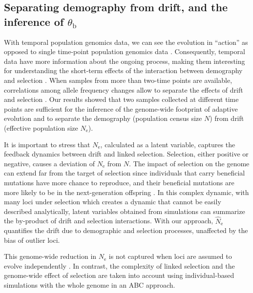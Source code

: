 \documentclass[a4paper, 12pt]{article}
\begin{document}
\subsection*{Separating demography from drift, and the inference of $\theta_{\mathrm{b}}$}

With temporal population genomics data, we can see the evolution in ``action'' as opposed to single time-point population genomics data \citep{Feder:2021bt}. Consequently, temporal data have more information about the ongoing process, making them interesting for understanding the short-term effects of the interaction between demography and selection \citep{Buffalo:2019ab, Dehasque:2020ku, Williams:2020gk}. When samples from more than two-time points are available, correlations among allele frequency changes allow to separate the effects of drift and selection \citep[e.g.,][]{Buffalo:2020hq, Feder:2014fe}. Our results showed that two samples collected at different time points are sufficient for the inference of the genome-wide footprint of adaptive evolution and to separate the demography (population census size $N$) from drift (effective population size $N_{\mathrm{e}}$). 

It is important to stress that $N_{\mathrm{e}}$, calculated as a latent variable, captures the feedback dynamics between drift and linked selection. Selection, either positive or negative, causes a deviation of $N_\mathrm{e}$ from $N$. The impact of selection on the genome can extend far from the target of selection since individuals that carry beneficial mutations have more chance to reproduce, and their beneficial mutations are more likely to be in the next-generation offspring \citep{Walsh:2018tv}. In this complex dynamic, with many loci under selection which creates a dynamic that cannot be easily described analytically, latent variables obtained from simulations can summarize the by-product of drift and selection interactions. With our approach, $\hat N_\mathrm{e}$ quantifies the drift due to demographic and selection processes, unaffected by the bias of outlier loci.

This genome-wide reduction in $N_{\mathrm{e}}$ is not captured when loci are assumed to evolve independently \citep[as in][for example]{Sheehan:2016caa, Laval:2019jo}. In contrast, the complexity of linked selection and the genome-wide effect of selection are taken into account using individual-based simulations with the whole genome in an ABC approach. 
\end{document}
